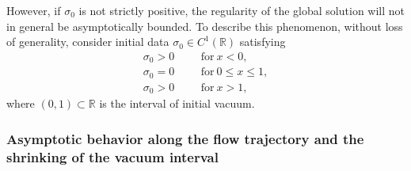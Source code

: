 \documentclass[11pt]{article}
\theoremstyle{plain}
\theoremstyle{definition}
\theoremstyle{remark}
\numberwithin{equation}{section}
\begin{document}
However, if $ \sigma_0 $ is not strictly positive, the regularity of the global solution will not in general be asymptotically bounded. To describe this phenomenon, without loss of generality, consider initial data $ \sigma_0 \in C^1(\mathbb R) $ satisfying  
\begin{equation}
    \label{initial-1-d}
    \begin{aligned}
        \sigma_0 > 0 & && \text{for} \ x < 0, \\
        \sigma_0 = 0 & && \text{for} \ 0 \leq x \leq 1, \\
        \sigma_0 > 0 & && \text{for} \ x > 1,
    \end{aligned}
\end{equation}
where $ (0, 1) \subset \mathbb R $ is the interval of initial vacuum. 

\subsubsection*{Asymptotic behavior along the flow trajectory and the shrinking of the vacuum interval}
\end{document}
